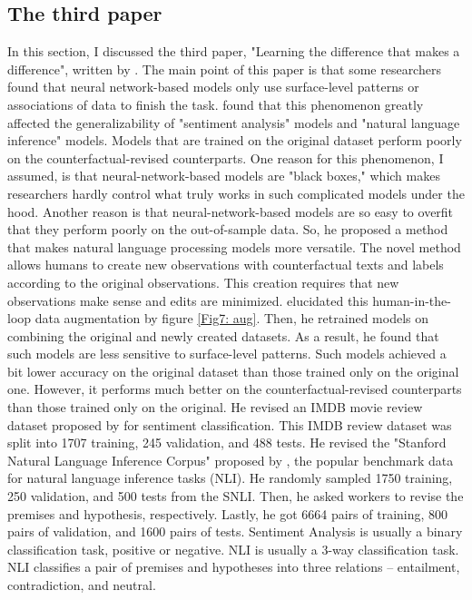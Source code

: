 \documentclass[aoas]{imsart}
\numberwithin{equation}{section}
\theoremstyle{plain}
\theoremstyle{remark}
\begin{document}
\subsection{The third paper} In this section, I discussed the third paper, "Learning the difference that makes a difference", written by \cite{DBLP:journals/corr/abs-1909-12434}. The main point of this paper is that some researchers found that neural network-based models only use surface-level patterns or associations of data to finish the task. \cite{DBLP:journals/corr/abs-1909-12434} found that this phenomenon greatly affected the generalizability of "sentiment analysis" models and "natural language inference" models. Models that are trained on the original dataset perform poorly on the counterfactual-revised counterparts. One reason for this phenomenon, I assumed, is that neural-network-based models are "black boxes," which makes researchers hardly control what truly works in such complicated models under the hood. Another reason is that neural-network-based models are so easy to overfit that they perform poorly on the out-of-sample data. So, he proposed a method that makes natural language processing models more versatile. The novel method allows humans to create new observations with counterfactual texts and labels according to the original observations. This creation requires that new observations make sense and edits are minimized. \cite{DBLP:journals/corr/abs-1909-12434} elucidated this human-in-the-loop data augmentation by figure \ref{Fig7: aug}. Then, he retrained models on combining the original and newly created datasets. As a result, he found that such models are less sensitive to surface-level patterns. Such models achieved a bit lower accuracy on the original dataset than those trained only on the original one. However, it performs much better on the counterfactual-revised counterparts than those trained only on the original. He revised an IMDB movie review dataset proposed by \cite{maas-etal-2011-learning} for sentiment classification. This IMDB review dataset was split into 1707 training, 245 validation, and 488 tests. He revised the "Stanford Natural Language Inference Corpus" proposed by \cite{bowman-etal-2015-large}, the popular benchmark data for natural language inference tasks (NLI). He randomly sampled 1750 training, 250 validation, and 500 tests from the SNLI. Then, he asked workers to revise the premises and hypothesis, respectively. Lastly, he got 6664 pairs of training, 800 pairs of validation, and 1600 pairs of tests. Sentiment Analysis is usually a binary classification task, positive or negative. NLI is usually a 3-way classification task. NLI classifies a pair of premises and hypotheses into three relations – entailment, contradiction, and neutral.
\end{document}
